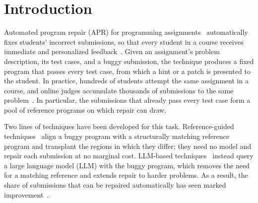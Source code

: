 \documentclass[acmsmall,screen,review,anonymous,nonacm]{acmart}
\begin{document}

\maketitle

\section{Introduction}

Automated program repair (APR) for programming assignments~\cite{gulwani2018automated,wang2018search,hu2019re,ahmed2022verifix,zhang2024pydex} automatically fixes students' incorrect submissions, so that every student in a course receives immediate and personalized feedback~\cite{yi2017feasibility}. Given an assignment's problem description, its test cases, and a buggy submission, the technique produces a fixed program that passes every test case, from which a hint or a patch is presented to the student. In practice, hundreds of students attempt the same assignment in a course, and online judges accumulate thousands of submissions to the same problem~\cite{penedo2025codeforces}. In particular, the submissions that already pass every test case form a pool of reference programs on which repair can draw.

Two lines of techniques have been developed for this task. Reference-guided techniques~\cite{gulwani2018automated,wang2018search,hu2019re,ahmed2022verifix} align a buggy program with a structurally matching reference program and transplant the regions in which they differ; they need no model and repair each submission at no marginal cost. LLM-based techniques~\cite{zhang2024pydex,xia2024automated,yang2024cref,liu2024fastfixer,orvalho2025counterexample,orvalho2025mentor,yang2026morepair,dai2026learner} instead query a large language model (LLM) with the buggy program, which removes the need for a matching reference and extends repair to harder problems. As a result, the share of submissions that can be repaired automatically has seen marked improvement~\cite{zhang2024pydex,orvalho2025mentor}.
\end{document}
